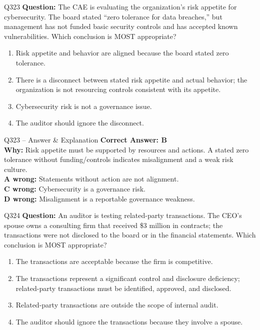 \documentclass[aspectratio=169,10pt]{beamer}
\begin{document}
	\begin{frame}[t]{Q323}
		\small
		\textbf{Question:} The CAE is evaluating the organization's risk appetite for cybersecurity. The board stated ``zero tolerance for data breaches,'' but management has not funded basic security controls and has accepted known vulnerabilities. Which conclusion is MOST appropriate?
		\begin{enumerate}[label=\Alph*.,itemsep=1pt,topsep=2pt]
			\item Risk appetite and behavior are aligned because the board stated zero tolerance.
			\item There is a disconnect between stated risk appetite and actual behavior; the organization is not resourcing controls consistent with its appetite.
			\item Cybersecurity risk is not a governance issue.
			\item The auditor should ignore the disconnect.
		\end{enumerate}
	\end{frame}
	
	\begin{frame}[t]{Q323 -- Answer \& Explanation}
		\small
		\textbf{Correct Answer: B} \\[4pt]
		\textbf{Why:} Risk appetite must be supported by resources and actions. A stated zero tolerance without funding/controls indicates misalignment and a weak risk culture. \\[4pt]
		\textbf{A wrong:} Statements without action are not alignment. \\[2pt]
		\textbf{C wrong:} Cybersecurity is a governance risk. \\[2pt]
		\textbf{D wrong:} Misalignment is a reportable governance weakness.
	\end{frame}
	
	\begin{frame}[t]{Q324}
		\small
		\textbf{Question:} An auditor is testing related-party transactions. The CEO's spouse owns a consulting firm that received \$3 million in contracts; the transactions were not disclosed to the board or in the financial statements. Which conclusion is MOST appropriate?
		\begin{enumerate}[label=\Alph*.,itemsep=1pt,topsep=2pt]
			\item The transactions are acceptable because the firm is competitive.
			\item The transactions represent a significant control and disclosure deficiency; related-party transactions must be identified, approved, and disclosed.
			\item Related-party transactions are outside the scope of internal audit.
			\item The auditor should ignore the transactions because they involve a spouse.
		\end{enumerate}
	\end{frame}
	
\end{document}

